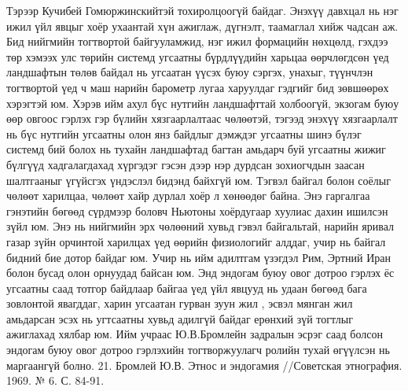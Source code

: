 Тэрээр Кучибей Гомюржинскийтэй тохиролцоогүй байдаг. Энэхүү давхцал нь нэг ижил үйл явцыг хоёр ухаантай хүн ажиглаж, дүгнэлт, таамаглал хийж чадсан аж. Бид нийгмийн тогтвортой байгууламжид, нэг ижил формацийн нөхцөлд, гэхдээ төр хэмээх улс төрийн системд угсаатны бүрдлүүдийн харьцаа өөрчлөгдсөн үед ландшафтын төлөв байдал нь угсаатан үүсэх буюу сэргэх, унахыг, түүнчлэн тогтвортой үед ч маш нарийн барометр лугаа харуулдаг гэдгийг бид зөвшөөрөх хэрэгтэй юм.
Хэрэв ийм ахул бүс нутгийн ландшафттай холбоогүй, экзогам буюу өөр овгоос гэрлэх гэр бүлийн хязгаарлалтаас чөлөөтэй, тэгээд энэхүү хязгаарлалт нь бүс нутгийн угсаатны олон янз байдлыг дэмждэг угсаатны шинэ бүлэг системд бий болох нь тухайн ландшафтад багтан амьдарч буй угсаатны жижиг бүлгүүд хадгалагдахад хүргэдэг гэсэн дээр нэр дурдсан зохиогчдын заасан шалтгааныг үгүйсгэх үндэслэл бидэнд байхгүй юм. Тэгвэл байгал болон соёлыг чөлөөт харилцаа, чөлөөт хайр дурлал хоёр л хөнөөдөг байна.
Энэ гаргалгаа гэнэтийн бөгөөд сүрдмээр боловч Ньютоны хоёрдугаар хуулиас дахин ишилсэн зүйл юм. Энэ нь нийгмийн эрх чөлөөний хувьд гэвэл байгальтай, нарийн яривал газар зүйн орчинтой харилцах үед өөрийн физиологийг алддаг, учир нь байгал бидний бие дотор байдаг юм.
Учир нь ийм адилтгам үзэгдэл Рим, Эртний Иран болон бусад олон орнуудад байсан юм. Энд эндогам буюу овог дотроо гэрлэх ёс угсаатны саад тотгор байдлаар байгаа үед үйл явцууд нь удаан бөгөөд бага зовлонтой явагддаг, харин угсаатан гурван зуун жил , эсвэл мянган жил амьдарсан эсэх нь угтсаатны хувьд адилгүй байдаг ерөнхий зүй тогтлыг ажиглахад хялбар юм. Ийм учраас Ю.В.Бромлейн задралын эсрэг саад болсон эндогам буюу овог дотроо гэрлэхийн тогтворжуулагч ролийн тухай өгүүлсэн нь маргаангүй болно. 21. Бромлей Ю.В. Этнос и эндогамия //Советская этнография. 1969. № 6. С. 84-91.
